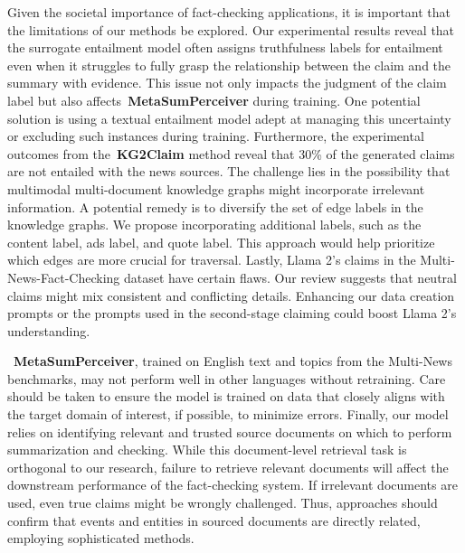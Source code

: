 Given the societal importance of fact-checking applications, it is important that the limitations of our methods be explored. Our experimental results reveal that the surrogate entailment model often assigns truthfulness labels for entailment even when it struggles to fully grasp the relationship between the claim and the summary with evidence. This issue not only impacts the judgment of the claim label but also affects~\textbf{MetaSumPerceiver} during training. One potential solution is using a textual entailment model adept at managing this uncertainty or excluding such instances during training. Furthermore, the experimental outcomes from the~\textbf{KG2Claim} method reveal that 30\% of the generated claims are not entailed with the news sources. The challenge lies in the possibility that multimodal multi-document knowledge graphs might incorporate irrelevant information. A potential remedy is to diversify the set of edge labels in the knowledge graphs. We propose incorporating additional labels, such as the content label, ads label, and quote label. This approach would help prioritize which edges are more crucial for traversal. Lastly, Llama 2's claims in the Multi-News-Fact-Checking dataset have certain flaws. Our review suggests that neutral claims might mix consistent and conflicting details. Enhancing our data creation prompts or the prompts used in the second-stage claiming could boost Llama 2's understanding.

~\textbf{MetaSumPerceiver}, trained on English text and topics from the Multi-News benchmarks, may not perform well in other languages without retraining. Care should be taken to ensure the model is trained on data that closely aligns with the target domain of interest, if possible, to minimize errors. Finally, our model relies on identifying relevant and trusted source documents on which to perform summarization and checking. While this document-level retrieval task is orthogonal to our research, failure to retrieve relevant documents will affect the downstream performance of the fact-checking system. If irrelevant documents are used, even true claims might be wrongly challenged. Thus, approaches should confirm that events and entities in sourced documents are directly related, employing sophisticated methods.
